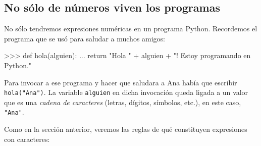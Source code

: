 
\subsection{No sólo de números viven los programas} \label{nosolo}

No sólo tendremos expresiones numéricas en un programa Python.
Recordemos el programa que se usó para saludar a muchos amigos:

\begin{codigo-python-sn}
>>> def hola(alguien):
...     return "Hola " + alguien + "! Estoy programando en Python."
\end{codigo-python-sn}

Para invocar a ese programa y hacer que saludara a Ana había que
escribir \lstinline!hola("Ana")!.
La variable \lstinline!alguien! en dicha invocación queda ligada a un
valor que es una \emph{cadena de caracteres} (letras, dígitos, símbolos,
etc.), en este caso, \lstinline!"Ana"!.

Como en la sección anterior, veremos las reglas de qué constituyen
expresiones con caracteres:

